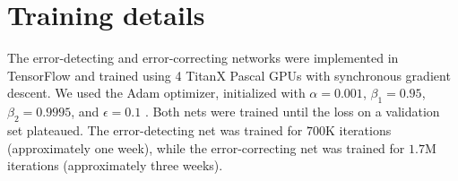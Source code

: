 \documentclass{article}
\begin{document}
\section{Training details}
The error-detecting and error-correcting networks were implemented in TensorFlow \cite{tensorflow} and trained using 4 TitanX Pascal GPUs with synchronous gradient descent. We used the Adam optimizer, initialized with $\alpha=0.001$, $\beta_1=0.95$, $\beta_2=0.9995$, and $\epsilon=0.1$ \cite{adam}.   Both nets were trained until the loss on a validation set plateaued. The error-detecting net was trained for $700$K iterations (approximately one week), while the error-correcting net was trained for $1.7$M iterations (approximately three weeks).

\newpage


\end{document}
